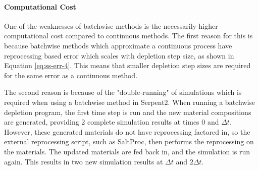




\paragraph{Computational Cost}

One of the weaknesses of batchwise methods is the necessarily higher computational cost compared to continuous methods. The first reason for this is because batchwise methods which approximate a continuous process have reprocessing based error which scales with depletion step size, as shown in Equation \eqref{eq:ss-err-4}. This means that smaller depletion step sizes are required for the same error as a continuous method. 

The second reason is because of the "double-running" of simulations which is required when using a batchwise method in Serpent2. When running a batchwise depletion program, the first time step is run and the new material compositions are generated, providing 2 complete simulation results at times 0 and $\Delta t$. However, these generated materials do not have reprocessing factored in, so the external reprocessing script, such as SaltProc, then performs the reprocessing on the materials. The updated materials are fed back in, and the simulation is run again. This results in two new simulation results at $\Delta t$ and $2 \Delta t$. 

